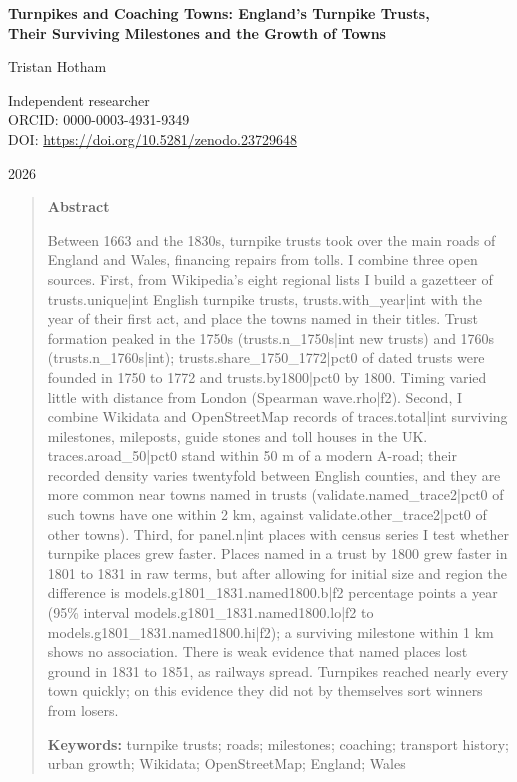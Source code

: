 \documentclass[11pt,a4paper]{article}
\begin{document}
\begin{center}
{\Large\bfseries Turnpikes and Coaching Towns: England's Turnpike Trusts,\\[2pt] Their Surviving Milestones and the Growth of Towns\par}
\vspace{1.2em}
{\large Tristan Hotham\par}
\vspace{0.3em}
{\small Independent researcher\\
ORCID: 0000-0003-4931-9349\\
DOI: \href{https://doi.org/10.5281/zenodo.23729648}{https://doi.org/10.5281/zenodo.23729648}\par}
\vspace{0.8em}
2026
\end{center}

\begin{quote}
\small
\begin{center}\textbf{Abstract}\end{center}
Between 1663 and the 1830s, turnpike trusts took over the main roads of England and Wales, financing repairs from tolls. I combine three open sources. First, from Wikipedia's eight regional lists I build a gazetteer of {{trusts.unique|int}} English turnpike trusts, {{trusts.with_year|int}} with the year of their first act, and place the towns named in their titles. Trust formation peaked in the 1750s ({{trusts.n_1750s|int}} new trusts) and 1760s ({{trusts.n_1760s|int}}); {{trusts.share_1750_1772|pct0}} of dated trusts were founded in 1750 to 1772 and {{trusts.by1800|pct0}} by 1800. Timing varied little with distance from London (Spearman {{wave.rho|f2}}). Second, I combine Wikidata and OpenStreetMap records of {{traces.total|int}} surviving milestones, mileposts, guide stones and toll houses in the UK. {{traces.aroad_50|pct0}} stand within 50 m of a modern A-road; their recorded density varies twentyfold between English counties, and they are more common near towns named in trusts ({{validate.named_trace2|pct0}} of such towns have one within 2 km, against {{validate.other_trace2|pct0}} of other towns). Third, for {{panel.n|int}} places with census series I test whether turnpike places grew faster. Places named in a trust by 1800 grew faster in 1801 to 1831 in raw terms, but after allowing for initial size and region the difference is {{models.g1801_1831.named1800.b|f2}} percentage points a year (95\% interval {{models.g1801_1831.named1800.lo|f2}} to {{models.g1801_1831.named1800.hi|f2}}); a surviving milestone within 1 km shows no association. There is weak evidence that named places lost ground in 1831 to 1851, as railways spread. Turnpikes reached nearly every town quickly; on this evidence they did not by themselves sort winners from losers.

\textbf{Keywords:} turnpike trusts; roads; milestones; coaching; transport history; urban growth; Wikidata; OpenStreetMap; England; Wales
\end{quote}
\end{document}
